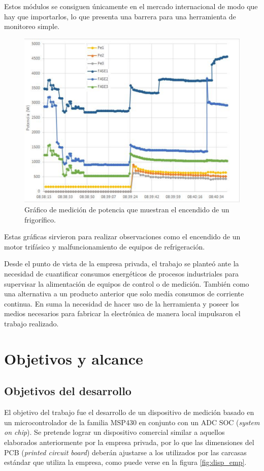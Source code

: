 Estos módulos se consiguen únicamente en el mercado internacional de modo que hay que importarlos, lo que presenta una barrera para una herramienta de monitoreo simple.

\begin{figure}[!h]
	\centering
	\includegraphics[width=120mm,keepaspectratio]{Figures/potencia_ej.png}
	\caption{Gráfico de medición de potencia que muestran el encendido de un frigorífico.}
	\label{fig:graficoW}
\end{figure}

Estas gráficas sirvieron para realizar observaciones como el encendido de un motor trifásico y malfuncionamiento de equipos de refrigeración.
 

Desde el punto de vista de la empresa privada, el trabajo se planteó ante la necesidad de cuantificar consumos energéticos de procesos industriales para supervisar la alimentación de equipos de control o de medición. También como una alternativa a un producto anterior que solo medía consumos de corriente continua. En suma la necesidad de hacer uso de la herramienta y poseer los medios necesarios para fabricar la electrónica de manera local  impulsaron el trabajo realizado.

\section{Objetivos y alcance}


\subsection{Objetivos del desarrollo}

El objetivo del trabajo fue el desarrollo de un dispositivo de medición basado en un microcontrolador de la familia MSP430 en conjunto con un ADC SOC (\textit{system on chip}). Se pretende lograr un dispositivo comercial similar a aquellos elaborados anteriormente por la empresa privada, por lo que las dimensiones del PCB (\textit{printed circuit board}) deberán ajustarse a los utilizados por las carcasas estándar que utiliza la empresa, como puede verse en la figura \ref{fig:disp_emp}.

